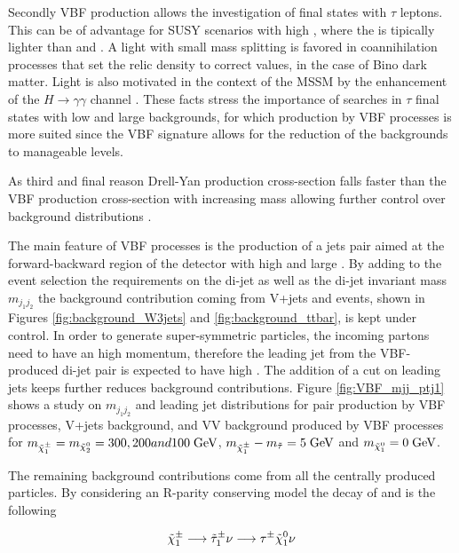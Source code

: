 Secondly VBF production allows the investigation of final states with $\tau$ leptons. This can be of advantage for SUSY scenarios with high \tanbeta, where the \stau is tipically lighter than  \smuon and \selectron  \cite{Hinchliffe:1999zc}. A light \stau with small mass splitting is favored in coannihilation processes \cite{Griest:1990kh} that set the relic density to correct values, in the case of Bino dark matter. Light \stau is also motivated in the context of the MSSM by the enhancement of the $H \longrightarrow \gamma\gamma$ channel \cite{Carena:2011aa}. These facts stress the importance of searches in $\tau$ final states with low \pt and large backgrounds, for which production by VBF processes is more suited since the VBF signature allows for the reduction of the backgrounds to manageable levels.

As third and final reason Drell-Yan production cross-section falls faster than the VBF production cross-section with increasing mass allowing further control over background distributions \cite{Datta:2002vy} .

The main feature of VBF processes is the production of a jets pair aimed at the forward-backward region of the detector with high \pt and large \deltaeta. By adding to the event selection the requirements on the di-jet \deltaeta as well as the di-jet invariant mass \ensuremath{m_{j_{1}j_{2}}} the background contribution coming from V+jets and \ttbar events, shown in Figures \ref{fig:background_W3jets} and \ref{fig:background_ttbar}, is kept under control. In order to generate super-symmetric particles, the incoming partons need to have an high momentum, therefore the leading jet from the VBF-produced di-jet pair is expected to have high \pt. The addition of a \pt cut on leading jets keeps further reduces background contributions. Figure \ref{fig:VBF_mjj_ptj1} shows a study on \ensuremath{m_{j_{1}j_{2}}} and leading jet \pt distributions for \charginopm \charginopm pair production by VBF processes, V+jets background, and VV background produced by VBF processes for \ensuremath{m_{\charginopm} = m_{\neutralinotwo} = 300, 200 and 100\gev}, \ensuremath{m_{\charginopm} - m_{\tilde{\tau}} = 5\gev} and \ensuremath{m_{\neutralinoone} = 0\gev}.

The remaining background contributions come from all the centrally produced particles. By considering an R-parity conserving model the decay of \charginopm and \neutralinotwo is the following

\begin{equation}
\tilde{\chi}^{\pm}_{1} \longrightarrow \tilde{\tau}_{1}^{\pm} \nu \longrightarrow \tau^{\pm} \tilde{\chi}^{0}_{1} \nu
\end{equation}

